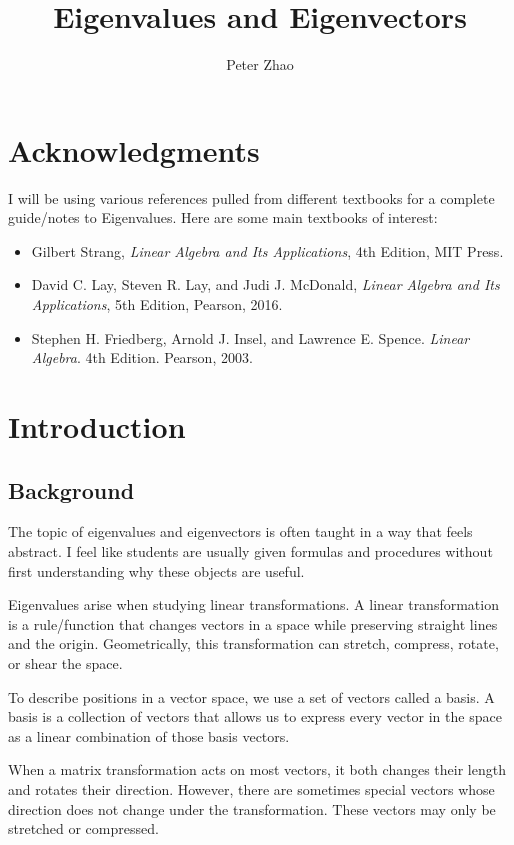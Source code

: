 \documentclass{article}
\title{Eigenvalues and Eigenvectors}
\author{Peter Zhao}
\begin{document}
\date{}
\maketitle

\section*{Acknowledgments}
I will be using various references pulled from different textbooks for a complete guide/notes to Eigenvalues. Here are some main textbooks of interest: 

\begin{itemize}
\item Gilbert Strang, \textit{Linear Algebra and Its Applications}, 4th Edition, MIT Press.

\item David C. Lay, Steven R. Lay, and Judi J. McDonald,
\textit{Linear Algebra and Its Applications}, 5th Edition,
Pearson, 2016.

\item Stephen H. Friedberg, Arnold J. Insel, and Lawrence E. Spence.
\textit{Linear Algebra}. 4th Edition. Pearson, 2003.


\end{itemize}

\section{Introduction}
\subsection{Background}
The topic of eigenvalues and eigenvectors is often taught in a way that feels abstract. 
I feel like students are usually given formulas and procedures without first understanding why these
objects are useful.

Eigenvalues arise when studying linear transformations. A linear transformation is a rule/function
that changes vectors in a space while preserving straight lines and the origin. Geometrically,
this transformation can stretch, compress, rotate, or shear the space.

To describe positions in a vector space, we use a set of vectors called a basis. A basis is
a collection of vectors that allows us to express every vector in the space as a linear
combination of those basis vectors.

When a matrix transformation acts on most vectors, it both changes their length and rotates
their direction. However, there are sometimes special vectors whose direction does not
change under the transformation. These vectors may only be stretched or compressed.
\end{document}
